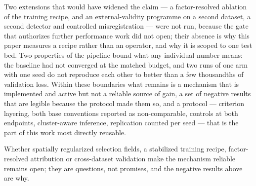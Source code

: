 \documentclass[pdflatex,sn-mathphys-num]{sn-jnl}
\theoremstyle{thmstyleone}%
\theoremstyle{thmstyletwo}%
\theoremstyle{thmstylethree}%
\begin{document}
Two extensions that would have widened the claim --- a factor-resolved ablation of the training recipe, and an external-validity programme on a second dataset, a second detector and controlled misregistration --- were not run, because the gate that authorizes further performance work did not open; their absence is why this paper measures a recipe rather than an operator, and why it is scoped to one test bed. Two properties of the pipeline bound what any individual number means: the baseline had not converged at the matched budget, and two runs of one arm with one seed do not reproduce each other to better than a few thousandths of validation loss. Within these boundaries what remains is a mechanism that is implemented and active but not a reliable source of gain, a set of negative results that are legible because the protocol made them so, and a protocol --- criterion layering, both base conventions reported as non-comparable, controls at both endpoints, cluster-aware inference, replication counted per seed --- that is the part of this work most directly reusable.

Whether spatially regularized selection fields, a stabilized training recipe, factor-resolved attribution or cross-dataset validation make the mechanism reliable remains open; they are questions, not promises, and the negative results above are why.

\backmatter


\end{document}
